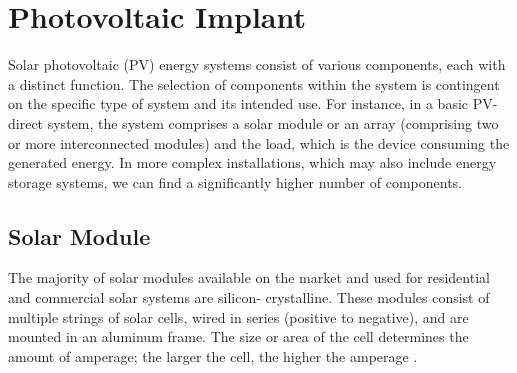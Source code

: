 \section{Photovoltaic Implant}\label{sec:pv}


Solar photovoltaic (PV) energy systems consist of various components, each with a distinct function. The selection of components within the system is contingent on the specific type of system and its intended use. For instance, in a basic PV-direct system, the system comprises a solar module or an array (comprising two or more interconnected modules) and the load, which is the device consuming the generated energy\cite{pvarizona}.
In more complex installations, which may also include energy storage systems, we can find a significantly higher number of components.


\subsection{Solar Module}
The majority of solar modules available on the market and
used for residential and commercial solar systems are silicon-
crystalline. These modules consist of multiple strings of solar
cells, wired in series (positive to negative), and are mounted
in an aluminum frame. The size or area of
the cell determines the amount of amperage; the larger the
cell, the higher the amperage \cite{pvarizona}.

